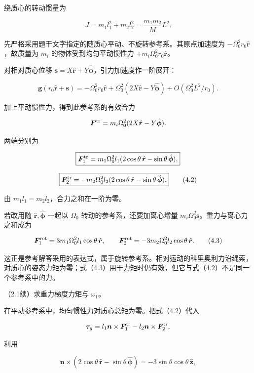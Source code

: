 \documentclass[12pt,a4paper,fontset=fandol]{ctexart}
\begin{document}
绕质心的转动惯量为

\[
J=m_1l_1^2+m_2l_2^2=\frac{m_1m_2}{M}L^2.
\tag{4.1}
\]

先严格采用题干文字指定的随质心平动、不旋转参考系。其原点加速度为
\(-\Omega_0^2r_0\hat{\boldsymbol r}\)，故质量为 \(m_i\)
的物体受到均匀平动惯性力 \(+m_i\Omega_0^2r_0\hat{\boldsymbol r}\)。

对相对质心位移
\(\boldsymbol s=X\hat{\boldsymbol r}+Y\hat{\boldsymbol\phi}\)，引力加速度作一阶展开：

\[
\boldsymbol g(r_0\hat{\boldsymbol r}+\boldsymbol s)
=-\Omega_0^2r_0\hat{\boldsymbol r}
+\Omega_0^2(2X\hat{\boldsymbol r}-Y\hat{\boldsymbol\phi})
+O\!\left(\Omega_0^2L^2/r_0\right).
\]

加上平动惯性力，得到此参考系的有效合力

\[
\boldsymbol F^{\rm tr}
=m_i\Omega_0^2(2X\hat{\boldsymbol r}-Y\hat{\boldsymbol\phi}).
\]

两端分别为

\[
\boxed{\boldsymbol F_1^{\rm tr}
=m_1\Omega_0^2l_1(2\cos\theta\,\hat{\boldsymbol r}
-\sin\theta\,\hat{\boldsymbol\phi}),}
\]

\[
\boxed{\boldsymbol F_2^{\rm tr}
=-m_2\Omega_0^2l_2(2\cos\theta\,\hat{\boldsymbol r}
-\sin\theta\,\hat{\boldsymbol\phi}).}
\tag{4.2}
\]

由 \(m_1l_1=m_2l_2\)，合力之和在一阶为零。

若改用随 \(\hat{\boldsymbol r},\hat{\boldsymbol\phi}\) 一起以
\(\Omega_0\) 转动的参考系，还要加离心增量
\(m_i\Omega_0^2\boldsymbol s\)。重力与离心力之和成为

\[
\boldsymbol F_1^{\rm rot}=3m_1\Omega_0^2l_1\cos\theta\,\hat{\boldsymbol r},
\qquad
\boldsymbol F_2^{\rm rot}=-3m_2\Omega_0^2l_2\cos\theta\,\hat{\boldsymbol r}.
\tag{4.3}
\]

这正是参考解答采用的表达式，属于旋转参考系。相对运动的科里奥利力沿绳索，对质心的姿态力矩为零；式（4.3）用于力矩时仍有效，但它与式（4.2）不是同一个参考系中的力。

（2.1续）求重力梯度力矩与 \(\omega_1\)。

在平动参考系中，均匀惯性力对质心总矩为零。把式（4.2）代入

\[
\boldsymbol\tau_g=l_1\boldsymbol n\times\boldsymbol F_1^{\rm tr}
-l_2\boldsymbol n\times\boldsymbol F_2^{\rm tr},
\]

利用

\[
\boldsymbol n\times(2\cos\theta\,\hat{\boldsymbol r}
-\sin\theta\,\hat{\boldsymbol\phi})
=-3\sin\theta\cos\theta\,\hat{\boldsymbol z},
\]
\end{document}
